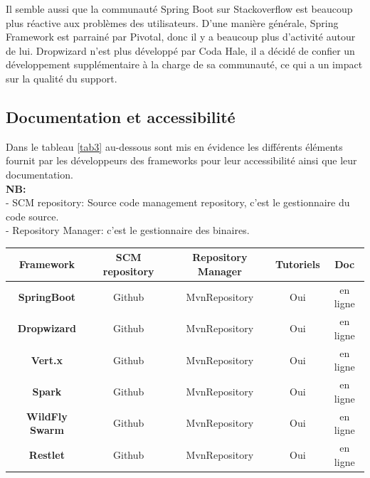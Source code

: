 \documentclass[12pt, a4paper, openany]{report}
\begin{document}
   Il semble aussi que la communauté Spring Boot sur Stackoverflow est beaucoup plus réactive aux problèmes des utilisateurs. D'une manière générale, Spring Framework est parrainé par Pivotal, donc il y a beaucoup plus d'activité autour de lui. Dropwizard n'est plus développé par Coda Hale, il a décidé de confier un développement supplémentaire à la charge de sa communauté, ce qui a un impact sur la qualité du support.
   
   
  \subsection{Documentation et accessibilité}
  
   Dans le tableau \ref{tab3} au-dessous sont mis en évidence les différents éléments fournit par les développeurs des frameworks pour leur accessibilité ainsi que leur documentation.\\
   
   \textbf{NB:} \\
    - SCM repository: Source code management repository, c'est le gestionnaire du code source.\\
    - Repository Manager: c'est le gestionnaire des binaires.
   
   \begin{center}
   \begin{tabular}{|c|c|c|c|c|}
    \hline
    
    \rowcolor[rgb]{0.5,0.5,0}\textbf{Framework}&\textbf{SCM repository}&\textbf{Repository Manager}&\textbf{Tutoriels}&\textbf{Doc} \\ \hline
    
    \textbf{SpringBoot} & Github & MvnRepository & Oui & en ligne \\ \hline
     
    \textbf{Dropwizard} & Github & MvnRepository & Oui & en ligne \\ \hline
     
     \textbf{Vert.x} & Github & MvnRepository & Oui & en ligne \\ \hline
     
     \textbf{Spark} & Github & MvnRepository & Oui & en ligne \\ \hline
     
     \textbf{WildFly Swarm} & Github & MvnRepository & Oui & en ligne \\ \hline
     
     \textbf{Restlet} & Github & MvnRepository & Oui & en ligne \\ \hline
     
   \end{tabular}
   \label{tab3}
   \end{center}
   
\end{document}
